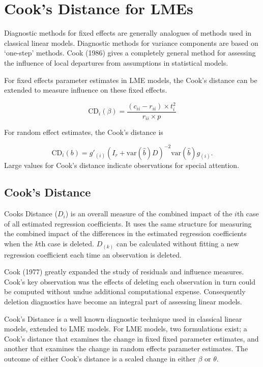 \documentclass[Main.tex]{subfiles}
\begin{document}
	\section{Cook's Distance for LMEs} %
	Diagnostic methods for fixed effects are generally analogues of methods used in classical linear models.
	Diagnostic methods for variance components are based on `one-step' methods. Cook (1986) gives a completely general method for assessing the influence of local departures from assumptions in statistical models.
	
	For fixed effects parameter estimates in LME models, the  Cook's distance can be extended to measure influence on these fixed effects.
	
	\[
	\mbox{CD}_{i}(\beta) = \frac{(c_{ii} - r_{ii}) \times t^2_{i}}{r_{ii} \times p}
	\]
	
	For random effect estimates, the  Cook's distance is
	
	\[
	\mbox{CD}_{i}(b) = g{\prime}_{(i)} (I_{r} + \mbox{var}(\hat{b})D)^{-2}\mbox{var}(\hat{b})g_{(i)}.
	\]
	Large values for Cook's distance indicate observations for special attention.

	
	
	\subsection{Cook's Distance}%
	Cooks Distance ($D_{i}$) is an overall measure of the combined impact of the $i$th case of all estimated regression coefficients. It uses the same structure for measuring the combined impact of the differences in the estimated regression coefficients when the $k$th case is deleted. $D_{(k)}$ can be calculated without fitting
	a new regression coefficient each time an observation is deleted.
	
	
	
	
	Cook (1977) greatly expanded the study of residuals and influence measures. Cook's key observation was the effects of deleting each observation in turn could be computed without undue additional computational expense. Consequently deletion diagnostics have become an integral part of assessing linear models.
	
	
	Cook's Distance is a well known diagnostic technique used in classical linear models, extended to LME models.  For LME models, two formulations exist; a Cook's distance that examines the change in fixed fixed parameter estimates, and another that examines the change in random effects parameter estimates. The outcome of either Cook's distance is a scaled change in either $\beta$ or $\theta$.
	
\end{document}
